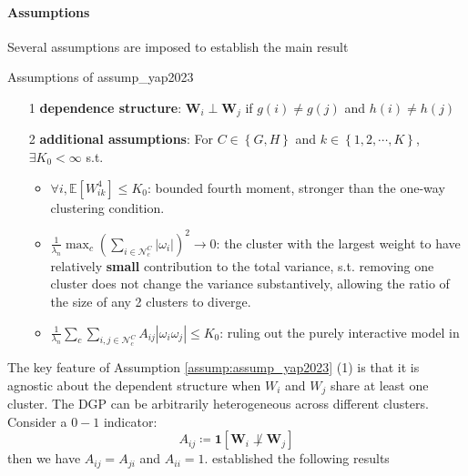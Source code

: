 \documentclass[twoside]{article}
\begin{document}
\paragraph*{Assumptions}
Several assumptions are imposed to establish the main result
\begin{assumption}{Assumptions of \citet{yap2023general}}{assump_yap2023}
    \begin{itemize}
        \item[1] {\textbf{dependence structure}}: $\mathbf{W}_i \perp \mathbf{W}_j $ if $g(i)\neq g(j)$ and $h(i)\neq h(j)$
        \item[2] {\textbf{additional assumptions}}: For $C\in \left\{G,H\right\}$ and $k\in \left\{ 1,2,\cdots,K \right\}$, $\exists K_0<\infty$ s.t. 
        \begin{itemize}
            \item $\forall i, \mathbb{E}\left[W_{ik}^4\right] \leq K_0$: bounded fourth moment, stronger than the one-way clustering condition.
            \item $\frac{1}{\lambda_n} \max_c \left( \sum_{i\in\mathcal{N}^C_c}\left\vert \omega_i \right\vert\right)^2  \rightarrow 0$: the cluster with the largest weight to have relatively \textbf{small} contribution to the total variance, s.t. removing one cluster does not change the variance substantively, allowing the ratio of the size of any 2 clusters to diverge.
            \item $\frac{1}{\lambda_n} \sum_c \sum_{i,j\in \mathcal{N}^C_c} A_{ij} \left\vert \omega_i \omega_j \right\vert \leq K_0$: ruling out the purely interactive model in \citet{menzel2021bootstrap}
        \end{itemize}
    \end{itemize}
\end{assumption}
The key feature of Assumption \ref{assump:assump_yap2023} (1) is that it is agnostic about the dependent structure when $W_i$ and $W_j$ share at least one cluster. The DGP can be arbitrarily heterogeneous across different clusters. Consider a $0-1$ indicator:
$$
A_{ij} \coloneq \mathbf{1}\left[\mathbf{W}_i \not\perp \mathbf{W}_j\right]
$$
then we have $A_{ij}=A_{ji}$ and $A_{ii}=1$. \citet{yap2023general} established the following results 
\end{document}
